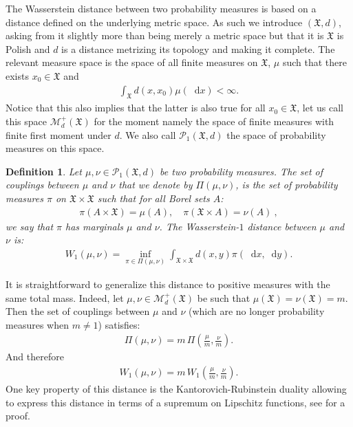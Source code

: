 \documentclass[11pt,a4paper]{article}
\newcommand{\MC}{\mathcal{M}}
\newcommand{\XF}{\mathfrak{X}}
\newcommand{\dd}{\mathop{}\!\mathrm{d}}
\newtheorem{definition}[theorem]{Definition}
\begin{document}
The Wasserstein distance between two probability measures is based on a distance defined on the underlying metric space. As such we introduce $(\XF,d)$, asking from it slightly more than being merely a metric space but that it is $\XF$ is Polish and $d$ is a distance metrizing its topology and making it complete. The relevant measure space is the space of all finite measures on $\XF$, $\mu$ such that there exists $x_0 \in \XF$ and 
\begin{align*}
    \int_{\XF} d(x,x_0) \mu(\dd x) < \infty.
\end{align*}
Notice that this also implies that the latter is also true for all $x_0 \in \XF$, let us call this space $\MC^+_d(\XF)$ for the moment namely the space of finite measures with finite first moment under $d$. We also call $\mathcal{P}_1(\XF,d)$ the space of probability measures on this space.
\begin{definition}\label{def:Wasserstein}
    Let $\mu,\nu \in \mathcal{P}_1(\XF,d)$ be two probability measures. The set of couplings between $\mu$ and $\nu$ that we denote by $\Pi(\mu,\nu)$, is the set of probability measures $\pi$ on $\XF\times \XF$ such that for all Borel sets $A$:
    \begin{align*}
        \pi(A\times\XF) = \mu(A) ,\quad  \pi(\XF\times A) = \nu(A)\ ,
    \end{align*}
    we say that $\pi$ has marginals $\mu$ and $\nu$. The Wasserstein-$1$ distance between $\mu$ and $\nu$ is:
    \begin{align*}
        W_1(\mu,\nu) = \inf\limits_{\pi \in\Pi(\mu,\nu)} \int_{\XF\times \XF} d(x,y) \pi(\dd x,\dd y).
    \end{align*}
\end{definition}
It is straightforward to generalize this distance to positive measures with the same total mass. Indeed, let $\mu, \nu \in \MC^+_d(\XF)$ be such that $\mu(\XF) = \nu(\XF) = m$. Then the set of couplings between $\mu$ and $\nu$ (which are no longer probability measures when $m \neq 1$) satisfies:
\begin{align*}
    \Pi(\mu,\nu) = m \, \Pi\left(\frac{\mu}{m}, \frac{\nu}{m}\right).
\end{align*}
And therefore
\begin{align*}
    W_1(\mu,\nu) = m\, W_1\left( \frac{\mu}{m}, \frac{\nu}{m}\right).
\end{align*}
One key property of this distance is the Kantorovich-Rubinstein duality allowing to express this distance in terms of a supremum on Lipschitz functions, see \cite{santambrogio2015optimal} for a proof.
\end{document}
